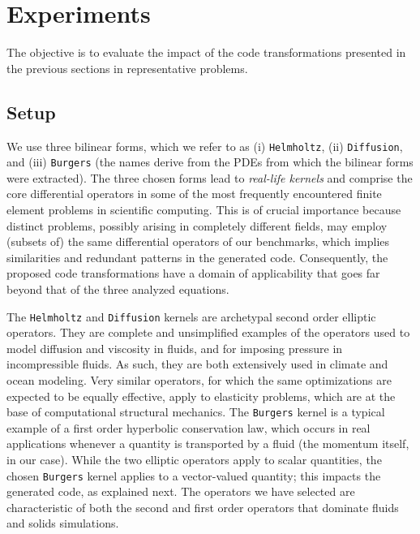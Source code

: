\section{Experiments}
\label{sec:coffee-perfeval}
The objective is to evaluate the impact of the code transformations presented in the previous sections in representative problems.

\subsection{Setup}
We use three bilinear forms, which we refer to as (i) {\tt Helmholtz}, (ii) {\tt Diffusion}, and (iii) {\tt Burgers} (the names derive from the PDEs from which the bilinear forms were extracted). The three chosen forms lead to \emph{real-life kernels} and comprise the core differential operators in some of the most frequently encountered finite element problems in scientific computing. This is of crucial importance because distinct problems, possibly arising in completely different fields, may employ (subsets of) the same differential operators of our benchmarks, which implies similarities and redundant patterns in the generated code. Consequently, the proposed code transformations have a domain of applicability that goes far beyond that of the three analyzed equations.

The {\tt Helmholtz} and {\tt Diffusion} kernels are archetypal second order elliptic operators. They are complete and unsimplified examples of the operators used to model diffusion and viscosity in fluids, and for imposing pressure in incompressible fluids. As such, they are both extensively used in climate and ocean modeling. Very similar operators, for which the same optimizations are expected to be equally effective, apply to elasticity problems, which are at the base of computational structural mechanics. The {\tt Burgers} kernel is a typical example of a first order hyperbolic conservation law, which occurs in real applications whenever a quantity is transported by a fluid (the momentum itself, in our case). While the two elliptic operators apply to scalar quantities, the chosen {\tt Burgers} kernel applies to a vector-valued quantity; this impacts the generated code, as explained next. The operators we have selected are characteristic of both the second and first order operators that dominate fluids and solids simulations. 

